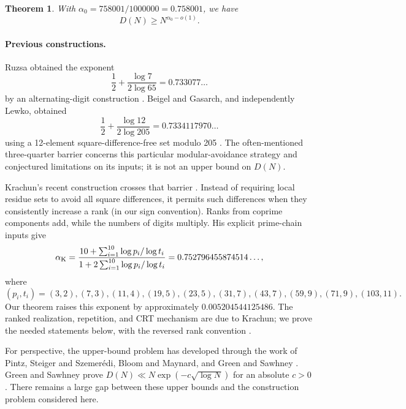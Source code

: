 \documentclass[11pt]{article}
\newtheorem{theorem}{Theorem}[section]
\theoremstyle{definition}
\theoremstyle{remark}
\newcommand{\al}{\alpha_0}
\begin{document}
\begin{theorem}\label{thm:main}
With $\al=758001/1000000=0.758001$, we have
\[
 D(N)\ge N^{\al-o(1)}.
\]
\end{theorem}

\paragraph{Previous constructions.}
Ruzsa obtained the exponent
\[
 \frac12+\frac{\log7}{2\log65}=0.733077\ldots
\]
by an alternating-digit construction \cite{Ruzsa1984}.
Beigel and Gasarch, and independently Lewko, obtained
\[
 \frac12+\frac{\log12}{2\log205}=0.7334117970\ldots
\]
using a 12-element square-difference-free set modulo 205
\cite{BeigelGasarch2008,Lewko2015}.
The often-mentioned three-quarter barrier concerns this particular
modular-avoidance strategy and conjectured limitations on its inputs;
it is not an upper bound on $D(N)$.

Krachun's recent construction crosses that barrier
\cite{Krachun2026}. Instead of requiring local residue sets to avoid all
square differences, it permits such differences when they consistently
increase a rank (in our sign convention). Ranks from coprime components add, while the numbers of
digits multiply. His explicit prime-chain inputs give
\begin{equation}\label{eq:krachun}
 \alpha_{\rm K}=
 \frac{10+\sum_{i=1}^{10}\log p_i/\log t_i}
      {1+2\sum_{i=1}^{10}\log p_i/\log t_i}
 =0.752796455874514\ldots,
\end{equation}
where
\[
 (p_i,t_i)=(3,2),(7,3),(11,4),(19,5),(23,5),
 (31,7),(43,7),(59,9),(71,9),(103,11).
\]
Our theorem raises this exponent by approximately $0.005204544125486$.
The ranked realization, repetition, and CRT mechanism are due to Krachun;
we prove the needed statements below, with the reversed rank convention
\cite[Lemmas 4--5]{Krachun2026}.

For perspective, the upper-bound problem has developed through the work of
Pintz, Steiger and Szemer\'edi, Bloom and Maynard, and Green and Sawhney
\cite{PintzSteigerSzemeredi1988,BloomMaynard2022,GreenSawhney2025}.
Green and Sawhney prove $D(N)\ll N\exp(-c\sqrt{\log N})$ for an absolute
$c>0$ \cite[Theorem 1.1]{GreenSawhney2025}. There remains a large gap
between these upper bounds and the construction problem considered here.
\end{document}
